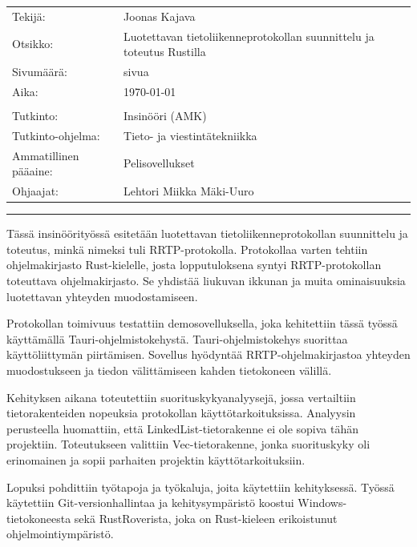 \documentclass[a4paper,12pt]{article}
\renewcommand{\title}{Luotettavan tietoliikenneprotokollan \newline suunnittelu ja toteutus Rustilla}
\newcommand{\me}{Joonas Kajava}
\newcommand{\pageCount}{ \pageref{LastPage}}
\newcommand*\sepline{
    \begin{center}
        \rule[1ex]{\textwidth}{.5pt}
    \end{center}}
\begin{document}
\begin{titlepage}
\setlength{\tabcolsep}{0cm}
        \begin{tabular} {p{5cm} p{10cm}}
            Tekijä:               & \me                                            \\
            Otsikko:              & \title                                         \\
            Sivumäärä:            & \pageCount{} sivua                             \\
            Aika:                 & \today                                         \\
            \\
            Tutkinto: & Insinööri (AMK) \\
            Tutkinto-ohjelma: & Tieto- ja viestintätekniikka \\
            Ammatillinen pääaine: & Pelisovellukset \\
            Ohjaajat: & Lehtori Miikka Mäki-Uuro\\
        \end{tabular}
        \sepline
        \begin{singlespace}
        
        Tässä insinöörityössä esitetään luotettavan tietoliikenneprotokollan suunnittelu ja toteutus, minkä nimeksi tuli RRTP-protokolla. Protokollaa varten tehtiin ohjelmakirjasto Rust-kielelle, josta lopputuloksena syntyi RRTP-protokollan toteuttava ohjelmakirjasto. Se yhdistää liukuvan ikkunan ja muita ominaisuuksia luotettavan yhteyden muodostamiseen. \par

        Protokollan toimivuus testattiin demosovelluksella, joka kehitettiin tässä työssä käyttämällä Tauri-ohjelmistokehystä. Tauri-ohjelmistokehys suorittaa käyttöliittymän piirtämisen. Sovellus hyödyntää RRTP-ohjelmakirjastoa yhteyden muodostukseen ja tiedon välittämiseen kahden tietokoneen välillä. \par

        Kehityksen aikana toteutettiin suorituskykyanalyysejä, jossa vertailtiin tietorakenteiden nopeuksia protokollan käyttötarkoituksissa. Analyysin perusteella huomattiin, että LinkedList-tietorakenne ei ole sopiva tähän projektiin. Toteutukseen valittiin Vec-tietorakenne, jonka suorituskyky oli erinomainen ja sopii parhaiten projektin käyttötarkoituksiin.\par

        Lopuksi pohdittiin työtapoja ja työkaluja, joita käytettiin kehityksessä. Työssä käytettiin Git-versionhallintaa ja kehitysympäristö koostui Windows-tietokoneesta sekä RustRoverista, joka on Rust-kieleen erikoistunut ohjelmointiympäristö. 
        

\end{singlespace}
\end{titlepage}
\end{document}
